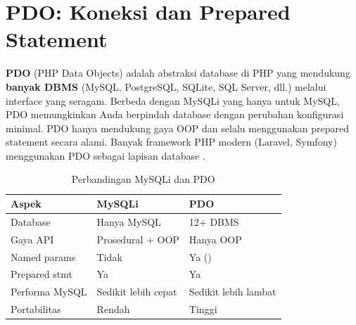 ﻿\section{PDO: Koneksi dan Prepared Statement}

\textbf{PDO} (PHP Data Objects) adalah abstraksi database di PHP yang mendukung \textbf{banyak DBMS} (MySQL, PostgreSQL, SQLite, SQL Server, dll.) melalui interface yang seragam. Berbeda dengan MySQLi yang hanya untuk MySQL, PDO memungkinkan Anda berpindah database dengan perubahan konfigurasi minimal. PDO hanya mendukung gaya OOP dan selalu menggunakan prepared statement secara alami. Banyak framework PHP modern (Laravel, Symfony) menggunakan PDO sebagai lapisan database \cite{phpManual}.

\begin{table}[H]
\centering
\begin{tabular}{|P{3.5cm}|P{5cm}|P{5cm}|}
\hline
\textbf{Aspek} & \textbf{MySQLi} & \textbf{PDO} \\
\hline
Database & Hanya MySQL & 12+ DBMS \\
\hline
Gaya API & Prosedural + OOP & Hanya OOP \\
\hline
Named params & Tidak & Ya () \\
\hline
Prepared stmt & Ya & Ya \\
\hline
Performa MySQL & Sedikit lebih cepat & Sedikit lebih lambat \\
\hline
Portabilitas & Rendah & Tinggi \\
\hline
\end{tabular}
\caption{Perbandingan MySQLi dan PDO}
\end{table}


